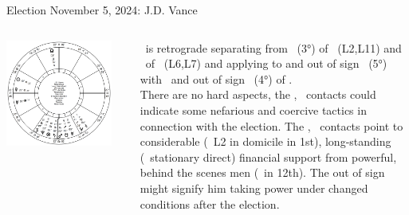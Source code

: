 \begin{frame}[t]{Election November 5, 2024: J.D. Vance}
\small
\begin{columns}[T, onlytextwidth]
\vspace{-1em}
{\includegraphics[width=0.9\textwidth]{charts/Vance.png}}
\fontsize{6pt}{7pt}\selectfont

\Jupiter\ is retrograde separating from \Trine\ (3°) of \Mercury\ (L2,L11) and \Sextile\ of \Saturn\ (L6,L7) and applying to and out of sign \Conjunction\ (5°) with \Neptune\, and out of sign \Sextile\ (4°) of \Pluto.\\
\vspace{0.5em} \tiny
There are no hard aspects, the \Neptune, \Pluto\ contacts could indicate some nefarious and coercive tactics in connection with the election. The \Mercury, \Saturn\, contacts point to considerable (\Mercury\ L2 in domicile in 1st), long-standing (\Saturn\ stationary direct) financial support from powerful, behind the scenes men (\Trine\Sun\ in 12th). The out of sign might signify him taking power under changed conditions after the election.



\end{columns}
\end{frame}
